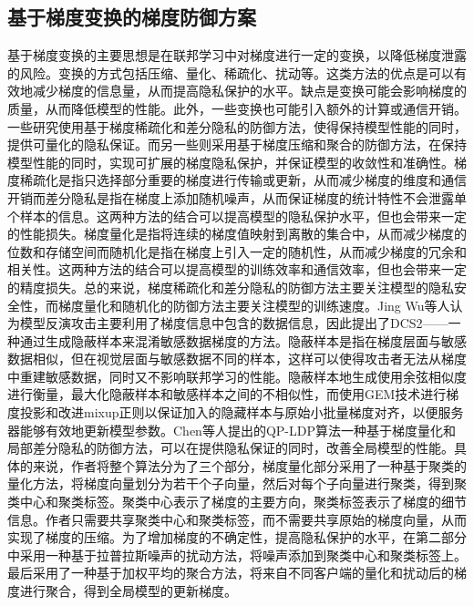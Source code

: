 \subsection{基于梯度变换的梯度防御方案}

基于梯度变换的主要思想是在联邦学习中对梯度进行一定的变换，以降低梯度泄露的风险。变换的方式包括压缩、量化、稀疏化、扰动等。这类方法的优点是可以有效地减少梯度的信息量，从而提高隐私保护的水平。缺点是变换可能会影响梯度的质量，从而降低模型的性能。此外，一些变换也可能引入额外的计算或通信开销。一些研究\cite{An_Optimized_Sparse_Response_Mechanism_for_Differentially_Private_Federated_Learning,PrivateDL_Privacy-preserving_collaborative_deep_learning_against_leakage_from_gradient_sharing}使用基于梯度稀疏化和差分隐私的防御方法，使得保持模型性能的同时，提供可量化的隐私保证。而另一些\cite{Gradient-Leakage_Resilient_Federated_Learning,DataLens_Scalable_Privacy_Preserving_Training_via_Gradient_Compression_and_Aggregation}则采用基于梯度压缩和聚合的防御方法，在保持模型性能的同时，实现可扩展的梯度隐私保护，并保证模型的收敛性和准确性。梯度稀疏化是指只选择部分重要的梯度进行传输或更新，从而减少梯度的维度和通信开销而差分隐私是指在梯度上添加随机噪声，从而保证梯度的统计特性不会泄露单个样本的信息。这两种方法的结合可以提高模型的隐私保护水平，但也会带来一定的性能损失。梯度量化是指将连续的梯度值映射到离散的集合中，从而减少梯度的位数和存储空间而随机化是指在梯度上引入一定的随机性，从而减少梯度的冗余和相关性。这两种方法的结合可以提高模型的训练效率和通信效率，但也会带来一定的精度损失。总的来说，梯度稀疏化和差分隐私的防御方法主要关注模型的隐私安全性，而梯度量化和随机化的防御方法主要关注模型的训练速度。Jing Wu等人\cite{Concealing_Sensitive_Samples_against_Gradient_Leakage_in_Federated_Learning}认为模型反演攻击主要利用了梯度信息中包含的数据信息，因此提出了DCS2——一种通过生成隐蔽样本来混淆敏感数据梯度的方法。隐蔽样本是指在梯度层面与敏感数据相似，但在视觉层面与敏感数据不同的样本，这样可以使得攻击者无法从梯度中重建敏感数据，同时又不影响联邦学习的性能。隐蔽样本地生成使用余弦相似度进行衡量，最大化隐蔽样本和敏感样本之间的不相似性，而使用GEM技术进行梯度投影和改进mixup正则以保证加入的隐藏样本与原始小批量梯度对齐，以便服务器能够有效地更新模型参数。Chen等人\cite{QP-LDP_for_better_global_model_performance_in_federated_learning}提出的QP-LDP算法一种基于梯度量化和局部差分隐私的防御方法，可以在提供隐私保证的同时，改善全局模型的性能。具体的来说，作者将整个算法分为了三个部分，梯度量化部分采用了一种基于聚类的量化方法，将梯度向量划分为若干个子向量，然后对每个子向量进行聚类，得到聚类中心和聚类标签。聚类中心表示了梯度的主要方向，聚类标签表示了梯度的细节信息。作者只需要共享聚类中心和聚类标签，而不需要共享原始的梯度向量，从而实现了梯度的压缩。为了增加梯度的不确定性，提高隐私保护的水平，在第二部分中采用一种基于拉普拉斯噪声的扰动方法，将噪声添加到聚类中心和聚类标签上。最后采用了一种基于加权平均的聚合方法，将来自不同客户端的量化和扰动后的梯度进行聚合，得到全局模型的更新梯度。


